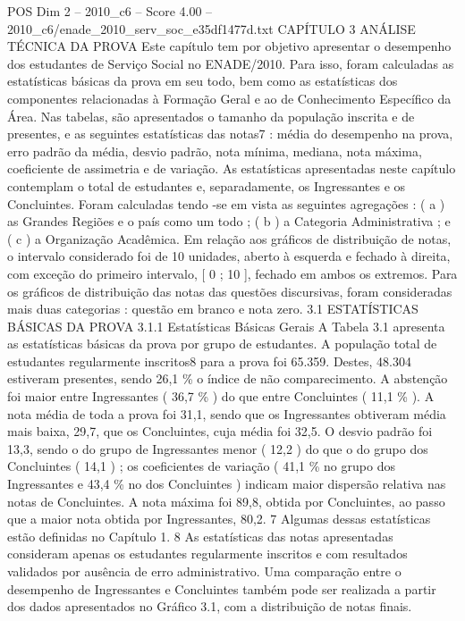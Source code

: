 \begin{textsample}{POS Dim 2 – 2010\_c6 – Score 4.00 – 2010\_c6/enade\_2010\_serv\_soc\_e35df1477d.txt}  \label{ex:f2_pos_180}
CAPÍTULO 3 ANÁLISE TÉCNICA DA PROVA Este capítulo tem por objetivo apresentar o desempenho dos estudantes de Serviço Social no ENADE/2010.
Para isso, foram calculadas as estatísticas básicas da prova em seu todo, bem como as estatísticas dos componentes relacionadas à Formação Geral e ao de Conhecimento Específico da Área.
Nas tabelas, são apresentados o tamanho da população inscrita e de presentes, e as seguintes estatísticas das notas7 : média do desempenho na prova, erro padrão da média, desvio padrão, nota mínima, mediana, nota máxima, coeficiente de assimetria e de variação.
As estatísticas apresentadas neste capítulo contemplam o total de estudantes e, separadamente, os Ingressantes e os Concluintes.
Foram calculadas tendo -se em vista as seguintes agregações : ( a ) as Grandes Regiões e o país como um todo ; ( b ) a Categoria Administrativa ; e ( c ) a Organização Acadêmica.
Em relação aos gráficos de distribuição de notas, o intervalo considerado foi de 10 unidades, aberto à esquerda e fechado à direita, com exceção do primeiro intervalo, [ 0 ; 10 ], fechado em ambos os extremos.
Para os gráficos de distribuição das notas das questões discursivas, foram consideradas mais duas categorias : questão em branco e nota zero. 3.1 ESTATÍSTICAS BÁSICAS DA PROVA 3.1.1 Estatísticas Básicas Gerais A Tabela 3.1 apresenta as estatísticas básicas da prova por grupo de estudantes.
A população total de estudantes regularmente inscritos8 para a prova foi 65.359.
Destes, 48.304 estiveram presentes, sendo 26,1 \% o índice de não comparecimento.
A abstenção foi maior entre Ingressantes ( 36,7 \% ) do que entre Concluintes ( 11,1 \% ).
A nota média de toda a prova foi 31,1, sendo que os Ingressantes obtiveram média mais baixa, 29,7, que os Concluintes, cuja média foi 32,5.
O desvio padrão foi 13,3, sendo o do grupo de Ingressantes menor ( 12,2 ) do que o do grupo dos Concluintes ( 14,1 ) ; os coeficientes de variação ( 41,1 \% no grupo dos Ingressantes e 43,4 \% no dos Concluintes ) indicam maior dispersão relativa nas notas de Concluintes.
A nota máxima foi 89,8, obtida por Concluintes, ao passo que a maior nota obtida por Ingressantes, 80,2. 7 Algumas dessas estatísticas estão definidas no Capítulo 1. 8 As estatísticas das notas apresentadas consideram apenas os estudantes regularmente inscritos e com resultados validados por ausência de erro administrativo.
Uma comparação entre o desempenho de Ingressantes e Concluintes também pode ser realizada a partir dos dados apresentados no Gráfico 3.1, com a distribuição de notas finais.

\end{textsample}
